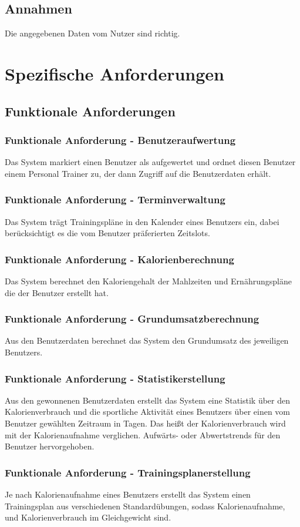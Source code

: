 \documentclass[12pt,a4paper,onecolumn]{article}
\begin{document}
\subsection{Annahmen}
Die angegebenen Daten vom Nutzer sind richtig.

\section{Spezifische Anforderungen}
\subsection{Funktionale Anforderungen}
\subsubsection{Funktionale Anforderung - Benutzeraufwertung}
Das System markiert einen Benutzer als aufgewertet und ordnet diesen Benutzer einem Personal Trainer zu, der dann Zugriff auf die Benutzerdaten erhält.
\subsubsection{Funktionale Anforderung - Terminverwaltung}
Das System trägt Trainingspläne in den Kalender eines Benutzers ein, dabei berücksichtigt es die vom Benutzer präferierten Zeitslots.
\subsubsection{Funktionale Anforderung - Kalorienberechnung}
Das System berechnet den Kaloriengehalt der Mahlzeiten und Ernährungspläne die der Benutzer erstellt hat.
\subsubsection{Funktionale Anforderung - Grundumsatzberechnung}
Aus den Benutzerdaten berechnet das System den Grundumsatz des jeweiligen Benutzers.
\subsubsection{Funktionale Anforderung - Statistikerstellung}
Aus den gewonnenen Benutzerdaten erstellt das System eine Statistik über den Kalorienverbrauch und die sportliche Aktivität eines Benutzers über einen vom Benutzer gewählten Zeitraum in Tagen. Das heißt der Kalorienverbrauch wird mit der Kalorienaufnahme verglichen. Aufwärts- oder Abwertstrends für den Benutzer hervorgehoben.
\subsubsection{Funktionale Anforderung - Trainingsplanerstellung}
Je nach Kalorienaufnahme eines Benutzers erstellt das System einen Trainingsplan aus verschiedenen Standardübungen, sodass Kalorienaufnahme, und Kalorienverbrauch im Gleichgewicht sind.
\end{document}
